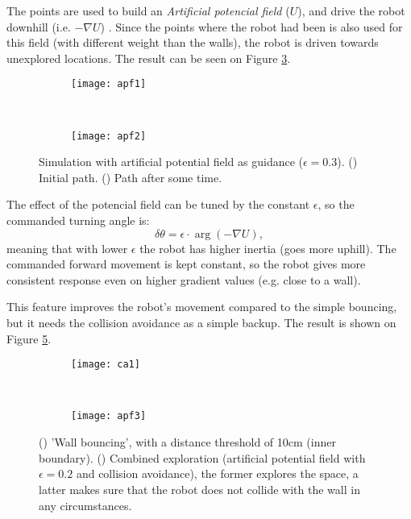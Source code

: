 		The points are used to build an \textit{Artificial potencial field} ($U$), and drive the robot downhill (i.e. $-\nabla U$) \parencite{choset_principles_2005}. Since the points where the robot had been is also used for this field (with different weight than the walls), the robot is driven towards unexplored locations. The result can be seen on Figure \ref{fig:apf}.
		
		\begin{figure}[h]
		    \centering
		    \begin{subfigure}[b]{0.48\textwidth}
   	 			\texttt{[image: apf1]}
   	 			\caption{}
				\label{fig:apf1}
   	 		\end{subfigure}		    
		    ~
		    \begin{subfigure}[b]{0.48\textwidth}
   	 			\texttt{[image: apf2]}
   	 			\caption{}
 				\label{fig:apf2}
   	 		\end{subfigure}
   	
		    \caption{Simulation with artificial potential field as guidance ($\epsilon=0.3$). (\protect{}) Initial path. (\protect{}) Path after some time.}
		    \label{fig:apf}
	 	\end{figure}
	 	
	 	
	 	
	 	The effect of the potencial field can be tuned by the constant $\epsilon$, so the commanded turning angle is:
	 	\begin{equation}
			\delta \theta=\epsilon\cdot\arg(-\nabla U),
	 	\end{equation}
	 	meaning that with lower $\epsilon$ the robot has higher inertia (goes more uphill). The commanded forward movement is kept constant, so the robot gives more consistent response even on higher gradient values (e.g. close to a wall).
	 	
	 	
	 	This feature improves the robot's movement compared to the simple bouncing, but it needs the collision avoidance as a simple backup. The result is shown on Figure \ref{fig:apf3}.

		
		\begin{figure}[h]
			\centering
			\begin{subfigure}[b]{0.48\textwidth}
				\texttt{[image: ca1]}
   	 			\caption{}
				\label{fig:ca}
   	 		\end{subfigure}		    
			~
			\begin{subfigure}[b]{0.48\textwidth}
			\texttt{[image: apf3]}
   	 			\caption{}
 				\label{fig:apf3}
   	 		\end{subfigure}
			
			
			\caption{(\protect{}) 'Wall bouncing', with a distance threshold of 10cm (inner boundary). (\protect{}) Combined exploration (artificial potential field with $\epsilon=0.2$ and collision avoidance), the former explores the space, a latter makes sure that the robot does not collide with the wall in any circumstances.}
			\label{fig:comb}
	 	\end{figure}
	 	
